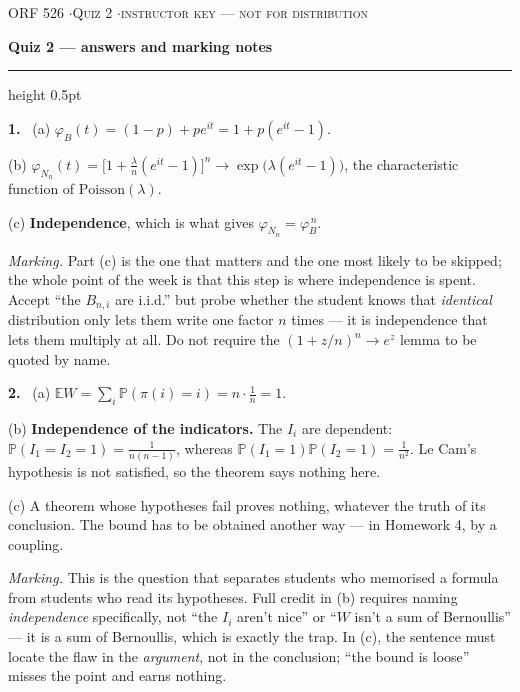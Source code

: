 \documentclass[11pt]{article}
\newcommand{\E}{\mathbb{E}}
\newcommand{\Prob}{\mathbb{P}}
\newcommand{\Poi}{\mathrm{Poisson}}
\begin{document}
{\footnotesize\color{acc}\textsc{ORF 526 \quad$\cdot$\quad Quiz 2 \quad$\cdot$\quad instructor key --- not for distribution}}

\vspace{0.4em}
{\large\bfseries Quiz 2 --- answers and marking notes}

\vspace{0.4em}
\hrule height 0.5pt
\vspace{0.4em}

\textbf{1.} \ (a) $\varphi_B(t)=(1-p)+pe^{it}=1+p(e^{it}-1)$.

(b) $\displaystyle\varphi_{N_n}(t)=\Big[1+\tfrac{\lambda}{n}(e^{it}-1)\Big]^{n}\longrightarrow \exp\big(\lambda(e^{it}-1)\big)$, the characteristic function of $\Poi(\lambda)$.

(c) \textbf{Independence}, which is what gives $\varphi_{N_n}=\varphi_{B}^{\,n}$.

{\color{grey}\emph{Marking.} Part (c) is the one that matters and the one most likely to be skipped; the whole point of the week is that this step is where independence is spent. Accept ``the $B_{n,i}$ are i.i.d.'' but probe whether the student knows that \emph{identical} distribution only lets them write one factor $n$ times --- it is independence that lets them multiply at all. Do not require the $(1+z/n)^n\to e^z$ lemma to be quoted by name.}

\vspace{0.9em}

\textbf{2.} \ (a) $\E W=\sum_i\Prob(\pi(i)=i)=n\cdot\tfrac1n=1$.

(b) \textbf{Independence of the indicators.} The $I_i$ are dependent: $\Prob(I_1=I_2=1)=\frac{1}{n(n-1)}$, whereas $\Prob(I_1=1)\Prob(I_2=1)=\frac{1}{n^2}$. Le Cam's hypothesis is not satisfied, so the theorem says nothing here.

(c) A theorem whose hypotheses fail proves nothing, whatever the truth of its conclusion. The bound has to be obtained another way --- in Homework 4, by a coupling.

{\color{grey}\emph{Marking.} This is the question that separates students who memorised a formula from students who read its hypotheses. Full credit in (b) requires naming \emph{independence} specifically, not ``the $I_i$ aren't nice'' or ``$W$ isn't a sum of Bernoullis'' --- it is a sum of Bernoullis, which is exactly the trap. In (c), the sentence must locate the flaw in the \emph{argument}, not in the conclusion; ``the bound is loose'' misses the point and earns nothing.}
\end{document}
